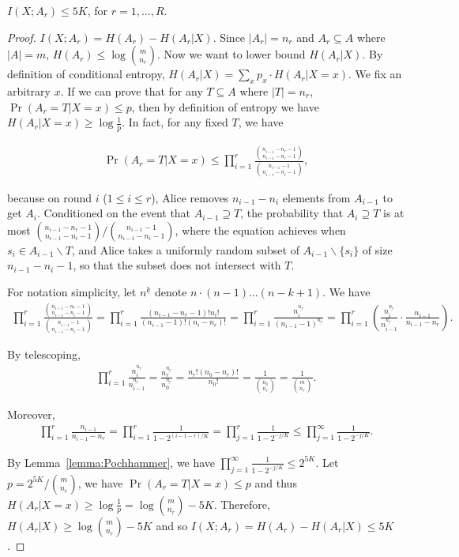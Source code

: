 \begin{lemma}\label{lemma:mutual-entropy-bound}
  $I(X;A_r)\le 5K$, for $r=1,\ldots, R$.
\end{lemma}

\begin{proof}
  $I(X;A_r)=H(A_r)-H(A_r|X)$. Since $|A_r|=n_r$ and $A_r\subseteq A$ where $|A|=m$, $H(A_r)\le \log {m \choose n_r}$. Now we want to lower bound $H(A_r|X)$. By definition of conditional entropy, $H(A_r|X)=\sum_x{p_x\cdot H(A_r|X=x)}$. We fix an arbitrary $x$. If we can prove that for any $T\subseteq A$ where $|T|=n_r$, $\Pr(A_r=T|X=x)\le p$, then by definition of entropy we have $H(A_r|X=x)\ge\log\frac{1}{p}$. In fact, for any fixed $T$, we have
  
  \begin{align}
    \Pr(A_r=T|X=x)\le \prod_{i=1}^{r}{\frac{{n_{i-1}-n_r-1 \choose n_{i-1}-n_i-1}}{{n_{i-1}-1 \choose n_{i-1}-n_i-1}}},
  \end{align}
  
  because on round $i$ ($1\le i \le r$), Alice removes $n_{i-1}-n_i$ elements from $A_{i-1}$ to get $A_i$. Conditioned on the event that $A_{i-1}\supseteq T$, the probability that $A_i\supseteq T$ is at most ${{n_{i-1}-n_r-1 \choose n_{i-1}-n_i-1}}/{{n_{i-1}-1 \choose n_{i-1}-n_i-1}}$, where the equation achieves when $s_i\in A_{i-1}\backslash T$, and Alice takes a uniformly random subset of $A_{i-1}\backslash \{s_i\}$ of size $n_{i-1}-n_i-1$, so that the subset does not intersect with $T$.
  
  For notation simplicity, let $n^{\underline{k}}$ denote $n\cdot (n-1)\ldots (n-k+1)$. We have 
  \begin{align}
    \prod_{i=1}^{r}{\frac{{n_{i-1}-n_r-1 \choose n_{i-1}-n_i-1}}{{n_{i-1}-1 \choose n_{i-1}-n_i-1}}}
    =\prod_{i=1}^{r}\frac{(n_{i-1}-n_r-1)!n_i!}{(n_{i-1}-1)!(n_i-n_r)!}
    =\prod_{i=1}^{r}\frac{n_i^{\underline{n_r}}}{(n_{i-1}-1)^{\underline{n_r}}}
    =\prod_{i=1}^{r} \left( \frac{n_i^{\underline{n_r}}}{n_{i-1}^{\underline{n_r}}}\cdot \frac{n_{i-1}}{n_{i-1}-n_r} \right).
  \end{align}
  
  By telescoping,
  \begin{align}
    \prod_{i=1}^{r} \frac{n_i^{\underline{n_r}}}{n_{i-1}^{\underline{n_r}}}
    =\frac{n_r^{\underline{n_r}}}{n_0^{\underline{n_r}}}
    =\frac{n_r!(n_0-n_r)!}{n_0!}=\frac{1}{{n_0 \choose n_r}}
    =\frac{1}{{m \choose n_r}}.
  \end{align}
  
  Moreover, 
  \begin{align}
    \prod_{i=1}^{r} \frac{n_{i-1}}{n_{i-1}-n_r}
    =\prod_{i=1}^{r} \frac{1}{1-2^{(i-1-r)/K}}
    =\prod_{j=1}^{r} \frac{1}{1-2^{-j/K}}
    \le \prod_{j=1}^{\infty} \frac{1}{1-2^{-j/K}}.
  \end{align}
  
  By Lemma~\ref{lemma:Pochhammer}, we have $\prod_{j=1}^{\infty} \frac{1}{1-2^{-j/K}}\le 2^{5K}$. Let $p={2^{5K}}/{{m\choose n_r}}$, we have $\Pr(A_r=T|X=x)\le p$ and thus $H(A_r|X=x)\ge \log\frac{1}{p}=\log{{m\choose n_r}}-5K$. Therefore, $H(A_r|X)\ge \log{{m\choose n_r}}-5K$ and so $I(X;A_r)=H(A_r)-H(A_r|X)\le 5K$.  
\end{proof}

